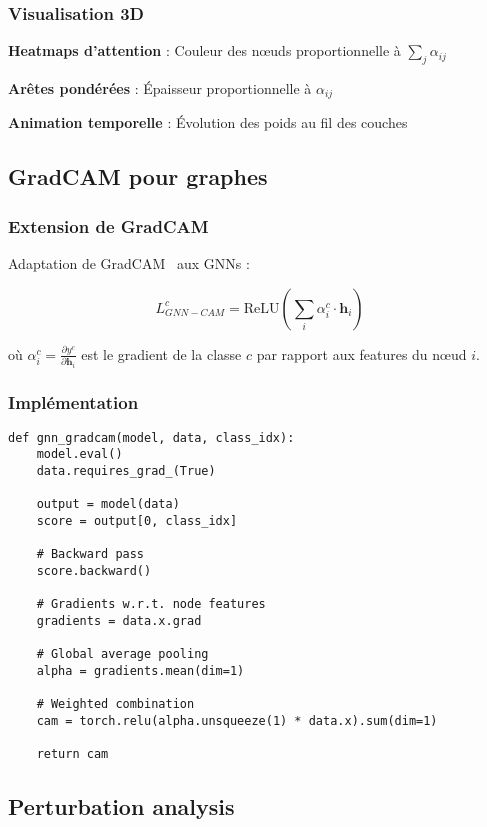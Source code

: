 \subsubsection{Visualisation 3D}

\textbf{Heatmaps d'attention} : Couleur des nœuds proportionnelle à $\sum_j \alpha_{ij}$

\textbf{Arêtes pondérées} : Épaisseur proportionnelle à $\alpha_{ij}$

\textbf{Animation temporelle} : Évolution des poids au fil des couches

\subsection{GradCAM pour graphes}

\subsubsection{Extension de GradCAM}

Adaptation de GradCAM~\cite{Selvaraju2017} aux GNNs :

\[
L_{GNN-CAM}^c = \text{ReLU}\left(\sum_i \alpha_i^c \cdot \mathbf{h}_i\right)
\]

où $\alpha_i^c = \frac{\partial y^c}{\partial \mathbf{h}_i}$ est le gradient de la classe $c$ par rapport aux features du nœud $i$.

\subsubsection{Implémentation}

\begin{verbatim}
def gnn_gradcam(model, data, class_idx):
    model.eval()
    data.requires_grad_(True)
    
    output = model(data)
    score = output[0, class_idx]
    
    # Backward pass
    score.backward()
    
    # Gradients w.r.t. node features
    gradients = data.x.grad
    
    # Global average pooling
    alpha = gradients.mean(dim=1)
    
    # Weighted combination
    cam = torch.relu(alpha.unsqueeze(1) * data.x).sum(dim=1)
    
    return cam
\end{verbatim}

\subsection{Perturbation analysis}

